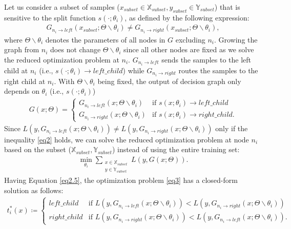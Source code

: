 \documentclass{article}
\begin{document}
Let us consider a subset of samples ($x_{subset}\in \mathbb{X}_{subset}, y_{subset}\in \mathbb{Y}_{subset}$) that is sensitive to the split function $s(\cdot; \theta_i)$, as defined by the following expression:
\begin{gather}
\label{eq2}
    G_{n_i\to left}(x_{subset}; \Theta \backslash \theta_i) \neq G_{n_i\to right}(x_{subset}; \Theta \backslash \theta_i),
\end{gather}
where $\Theta \backslash \theta_i$ denotes the parameters of all nodes in $G$ excluding $n_i$. Growing the graph from $n_i$ does not change $\Theta \backslash \theta_i$ since all other nodes are fixed as we solve the reduced optimization problem at $n_i$. 
$G_{n_i\to left}$ sends the samples to the left child at $n_i$ (i.e., $s(\cdot;\theta_i)\to left\_child$) while $G_{n_i\to right}$  routes the samples to the right child at $n_i$. With $\Theta \backslash \theta_i$ being fixed, the output of decision graph only depends on $\theta_i$ (i.e., $s(\cdot;\theta_i)$)
\begin{gather}
\label{eq2.5}
G(x; \Theta)=
    \begin{cases}
        G_{n_i\to left}(x; \Theta \backslash \theta_i)  & \text{if } s(x;\theta_i)\to left\_child\\
        G_{n_i\to right}(x; \Theta \backslash \theta_i) & \text{if } s(x;\theta_i)\to right\_child.
    \end{cases}
\end{gather}
Since $L(y, G_{n_i\to left}(x; \Theta \backslash \theta_i)) \neq L(y, G_{n_i\to right}(x; \Theta \backslash \theta_i))$ only if the inequality \eqref{eq2} holds, we can solve the reduced optimization problem at node $n_i$ based on the subset ($\mathbb{X}_{subset}, \mathbb{Y}_{subset}$) instead of using the entire training set:
\begin{gather}
\label{eq3}
    \min_{\theta_i} \sum_{\substack{x\in\mathbb{X}_{subset}\\
                  y\in\mathbb{Y}_{subset}}} L(y, G(x; \Theta)).
\end{gather}
Having Equation \eqref{eq2.5}, the optimization problem \eqref{eq3} has a closed-form solution as follows:
\begin{gather}
\label{eq4}
t_{i}^{*}(x) \coloneqq
    \begin{cases}
      left\_child & \text{if } L(y, G_{n_i\to left}(x; \Theta \backslash \theta_i))<L(y, G_{n_i\to right}(x; \Theta \backslash \theta_i))\\
      right\_child & \text{if } L(y, G_{n_i\to right}(x; \Theta \backslash \theta_i))<L(y, G_{n_i\to left}(x; \Theta \backslash \theta_i)).
    \end{cases}   
\end{gather}
\end{document}
